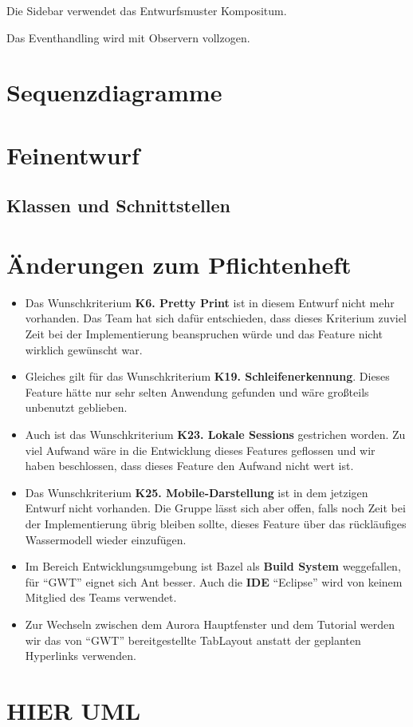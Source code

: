 \documentclass[parskip=full,11pt,twoside]{scrbook}
\begin{document}
Die Sidebar verwendet das Entwurfsmuster Kompositum.

Das Eventhandling wird mit Observern vollzogen.

\pagebreak

\section{Sequenzdiagramme}


\section{Feinentwurf}


\newpage
\subsection{Klassen und Schnittstellen}

\pagebreak

\section{Änderungen zum Pflichtenheft}
    \begin{itemize}
        \item Das Wunschkriterium \textbf{K6. Pretty Print} ist in diesem Entwurf nicht mehr vorhanden.
            Das Team hat sich dafür entschieden, dass dieses Kriterium zuviel Zeit bei der Implementierung beanspruchen würde und das Feature nicht wirklich gewünscht war.

        \item Gleiches gilt für das Wunschkriterium \textbf{K19. Schleifenerkennung}.
            Dieses Feature hätte nur sehr selten Anwendung gefunden und wäre großteils unbenutzt geblieben.

        \item Auch ist das Wunschkriterium \textbf{K23. Lokale Sessions} gestrichen worden. 
            Zu viel Aufwand wäre in die Entwicklung dieses Features geflossen und wir haben beschlossen, dass dieses Feature den Aufwand nicht wert ist.

        \item Das Wunschkriterium \textbf{K25. Mobile-Darstellung} ist in dem jetzigen Entwurf nicht vorhanden.
            Die Gruppe lässt sich aber offen, falls noch Zeit bei der Implementierung übrig bleiben sollte, dieses Feature über das rückläufiges Wassermodell wieder einzufügen.

        \item Im Bereich Entwicklungsumgebung ist Bazel als \textbf{Build System} weggefallen, für \enquote{GWT} eignet sich Ant besser.
            Auch die \textbf{IDE} \enquote{Eclipse} wird von keinem Mitglied des Teams verwendet.

        \item Zur Wechseln zwischen dem Aurora Hauptfenster und dem Tutorial werden wir das von \enquote{GWT} bereitgestellte TabLayout anstatt der geplanten Hyperlinks verwenden.
    \end{itemize}


\section{HIER UML}



    
\end{document}
